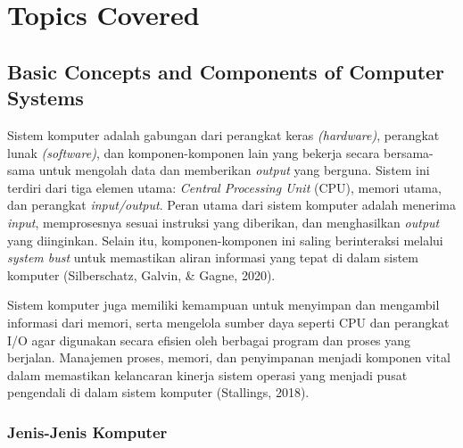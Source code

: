 \documentclass[12pt]{article}
\begin{document}
\section{Topics Covered}

\subsection{Basic Concepts and Components of Computer Systems}
     \hspace{0.61cm}Sistem komputer adalah gabungan dari perangkat keras \textit{(hardware)}, perangkat lunak \textit{(software)}, dan komponen-komponen lain yang bekerja secara bersama-sama untuk mengolah data dan memberikan \textit{output} yang berguna. Sistem ini terdiri dari tiga elemen utama: \textit{Central Processing Unit} (CPU), memori utama, dan perangkat \textit{input/output}. Peran utama dari sistem komputer adalah menerima \textit{input}, memprosesnya sesuai instruksi yang diberikan, dan menghasilkan \textit{output} yang diinginkan. Selain itu, komponen-komponen ini saling berinteraksi melalui \textit{system bust} untuk memastikan aliran informasi yang tepat di dalam sistem komputer (Silberschatz, Galvin, & Gagne, 2020).
    
    \hspace{0.61cm} Sistem komputer juga memiliki kemampuan untuk menyimpan dan mengambil informasi dari memori, serta mengelola sumber daya seperti CPU dan perangkat I/O agar digunakan secara efisien oleh berbagai program dan proses yang berjalan. Manajemen proses, memori, dan penyimpanan menjadi komponen vital dalam memastikan kelancaran kinerja sistem operasi yang menjadi pusat pengendali di dalam sistem komputer (Stallings, 2018).

\subsubsection{ Jenis-Jenis Komputer } 
\end{document}

